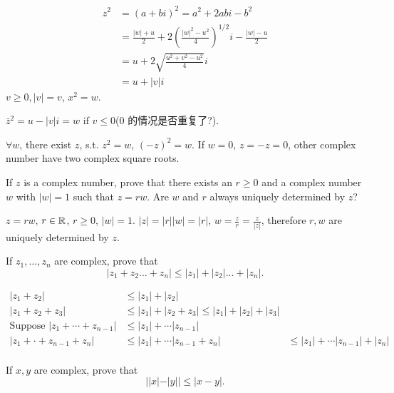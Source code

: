 \mySolve
\begin{align*}
    z^2 &= (a+bi)^2 = a^2 + 2abi - b^2 \\
    &= \frac{|w|+u}{2} + 2\left( \frac{|w|^2-u^2}{4} \right)^{1/2}i - \frac{|w|-u}{2}\\
    &= u + 2 \sqrt{\frac{u^2 + v^2 - u^2}{4}}i \\
    &= u + |v| i 
\end{align*}
$v \geq 0, |v| = v$, $x^2 = w$.

$\bar{z}^2 = u - |v| i = w$ if $v \leq 0$(0 的情况是否重复了?).

$\forall w$, there exist $z$, s.t. $z^2 = w$, $(-z)^2 = w$.
If $w = 0$, $z = -z = 0$, other complex number have two complex square roots.


\begin{myexercise}
    \label{ex:1.11}
    If $z$ is a complex number, prove that there exists an $r \geq 0$ and a complex number
    $w$ with $|w| = 1$ such that $z =rw$. Are $w$ and $r$ always uniquely determined by $z$?
\end{myexercise}

\mySolve 
$z = rw$, $r \in {\protect\mathbb R}$, $r \geq 0$, $|w| = 1$.
$|z| = |r||w| = |r|$, $w = \frac{z}{r} = \frac{z}{|z|}$,
therefore $r,w$ are uniquely determined by $z$.


\begin{myexercise}
    \label{ex:1.12}
    If $z_1 ,..., z_n$ are complex, prove that
    \begin{equation*}
        |z_1 + z_2 ...+ z_n| \leq 
        |z_1| + |z_2| ...+ |z_n|.
    \end{equation*}
\end{myexercise}

\mySolve 
\begin{align*}
    |z_1 + z_2| &\leq |z_1| + |z_2| \\
    |z_1 + z_2 + z_3| &\leq |z_1| + |z_2 + z_3| \leq |z_1| + |z_2| + |z_3| \\
    \text{Suppose } |z_1 + \cdots + z_{n-1}| &\leq |z_1| + \cdots |z_{n-1}| \\ 
    |z_1 + \cdot + z_{n-1} + z_n| &\leq |z_1| + \cdots |z_{n-1} + z_n| 
    &\leq |z_1| + \cdots |z_{n-1}| + |z_n| \\ 
\end{align*}


\begin{myexercise}
    \label{ex:1.13}
    If $x, y$ are complex, prove that
    \begin{equation*}
        ||x|-|y|| \leq |x-y|.
    \end{equation*}
\end{myexercise}

